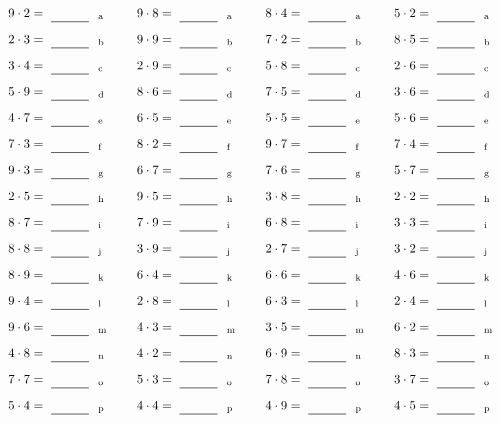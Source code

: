 \documentclass
[
  draft    = true,
  fontsize = 11pt,
  parskip  = half-
]
{scrartcl}
\begin{document}
\par\vfill\par
\begin{align*}
    \pline{9\cdot2}&=\rline{a}
  & \pline{9\cdot8}&=\rline{a}
  & \pline{8\cdot4}&=\rline{a}
  & \pline{5\cdot2}&=\rline{a} \\[1ex]
    \pline{2\cdot3}&=\rline{b}
  & \pline{9\cdot9}&=\rline{b}
  & \pline{7\cdot2}&=\rline{b}
  & \pline{8\cdot5}&=\rline{b} \\[1ex]
    \pline{3\cdot4}&=\rline{c}
  & \pline{2\cdot9}&=\rline{c}
  & \pline{5\cdot8}&=\rline{c}
  & \pline{2\cdot6}&=\rline{c} \\[1ex]
    \pline{5\cdot9}&=\rline{d}
  & \pline{8\cdot6}&=\rline{d}
  & \pline{7\cdot5}&=\rline{d}
  & \pline{3\cdot6}&=\rline{d} \\[1ex]
    \pline{4\cdot7}&=\rline{e}
  & \pline{6\cdot5}&=\rline{e}
  & \pline{5\cdot5}&=\rline{e}
  & \pline{5\cdot6}&=\rline{e} \\[1ex]
    \pline{7\cdot3}&=\rline{f}
  & \pline{8\cdot2}&=\rline{f}
  & \pline{9\cdot7}&=\rline{f}
  & \pline{7\cdot4}&=\rline{f} \\[1ex]
    \pline{9\cdot3}&=\rline{g}
  & \pline{6\cdot7}&=\rline{g}
  & \pline{7\cdot6}&=\rline{g}
  & \pline{5\cdot7}&=\rline{g} \\[1ex]
    \pline{2\cdot5}&=\rline{h}
  & \pline{9\cdot5}&=\rline{h}
  & \pline{3\cdot8}&=\rline{h}
  & \pline{2\cdot2}&=\rline{h} \\[1ex]
    \pline{8\cdot7}&=\rline{i}
  & \pline{7\cdot9}&=\rline{i}
  & \pline{6\cdot8}&=\rline{i}
  & \pline{3\cdot3}&=\rline{i} \\[1ex]
    \pline{8\cdot8}&=\rline{j}
  & \pline{3\cdot9}&=\rline{j}
  & \pline{2\cdot7}&=\rline{j}
  & \pline{3\cdot2}&=\rline{j} \\[1ex]
    \pline{8\cdot9}&=\rline{k}
  & \pline{6\cdot4}&=\rline{k}
  & \pline{6\cdot6}&=\rline{k}
  & \pline{4\cdot6}&=\rline{k} \\[1ex]
    \pline{9\cdot4}&=\rline{l}
  & \pline{2\cdot8}&=\rline{l}
  & \pline{6\cdot3}&=\rline{l}
  & \pline{2\cdot4}&=\rline{l} \\[1ex]
    \pline{9\cdot6}&=\rline{m}
  & \pline{4\cdot3}&=\rline{m}
  & \pline{3\cdot5}&=\rline{m}
  & \pline{6\cdot2}&=\rline{m} \\[1ex]
    \pline{4\cdot8}&=\rline{n}
  & \pline{4\cdot2}&=\rline{n}
  & \pline{6\cdot9}&=\rline{n}
  & \pline{8\cdot3}&=\rline{n} \\[1ex]
    \pline{7\cdot7}&=\rline{o}
  & \pline{5\cdot3}&=\rline{o}
  & \pline{7\cdot8}&=\rline{o}
  & \pline{3\cdot7}&=\rline{o} \\[1ex]
    \pline{5\cdot4}&=\rline{p}
  & \pline{4\cdot4}&=\rline{p}
  & \pline{4\cdot9}&=\rline{p}
  & \pline{4\cdot5}&=\rline{p}
\end{align*}
\end{document}
